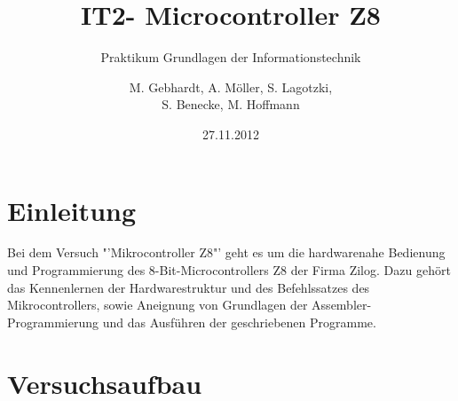 
\usepackage{paralist} %
\usepackage{circuitikz} %
\usepackage{picins}
\usepackage{wasysym}
\usepackage{pict2e}
\usepackage{lscape}
\usepackage{soul}
\usepackage[right]{eurosym}
\usepackage{array}
\usepackage{multirow}
\usepackage{tikz}
\usetikzlibrary{shapes,arrows}
\title{IT2- Microcontroller Z8}
\subtitle{Praktikum Grundlagen der Informationstechnik}
\author{M. Gebhardt, A. Möller, S. Lagotzki,\\S. Benecke, M. Hoffmann}
\date{27.11.2012}
\publishers{Marc.Gebhardt@st.ovgu.de}

\maketitle
{}
\begingroup
  \pagestyle{empty}
  \tableofcontents
  \newpage
\endgroup  
\setcounter{page}{1}

\section{Einleitung}

Bei dem Versuch "'Mikrocontroller Z8"' geht es um die hardwarenahe Bedienung und Programmierung des 8-Bit-Microcontrollers Z8 der Firma Zilog. Dazu gehört das Kennenlernen der Hardwarestruktur und des Befehlssatzes des Mikrocontrollers, sowie Aneignung von Grundlagen der Assembler-Programmierung und das Ausführen der geschriebenen Programme. 

\section{Versuchsaufbau}

